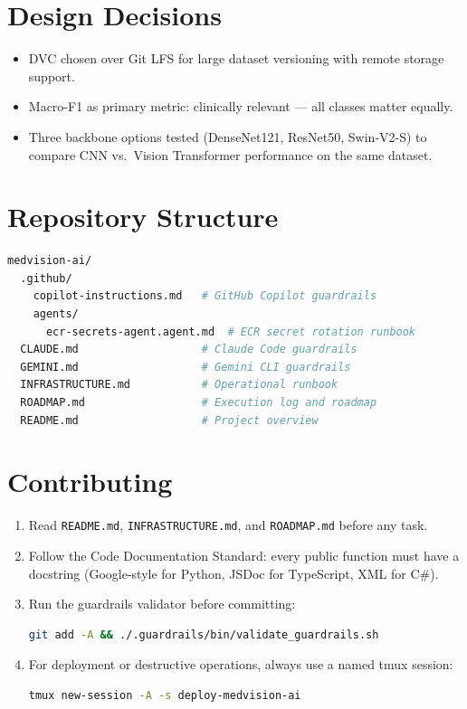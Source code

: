 \documentclass[11pt,a4paper]{article}
\begin{document}
\section{Design Decisions}

\begin{itemize}
  \item DVC chosen over Git LFS for large dataset versioning with remote storage support.
  \item Macro-F1 as primary metric: clinically relevant — all classes matter equally.
  \item Three backbone options tested (DenseNet121, ResNet50, Swin-V2-S) to compare
    CNN vs.\ Vision Transformer performance on the same dataset.
\end{itemize}


\section{Repository Structure}
\begin{lstlisting}[language=bash,caption={Top-level directory layout}]
medvision-ai/
  .github/
    copilot-instructions.md   # GitHub Copilot guardrails
    agents/
      ecr-secrets-agent.agent.md  # ECR secret rotation runbook
  CLAUDE.md                   # Claude Code guardrails
  GEMINI.md                   # Gemini CLI guardrails
  INFRASTRUCTURE.md           # Operational runbook
  ROADMAP.md                  # Execution log and roadmap
  README.md                   # Project overview
\end{lstlisting}

\section{Contributing}
\begin{enumerate}
  \item Read \texttt{README.md}, \texttt{INFRASTRUCTURE.md}, and \texttt{ROADMAP.md} before any task.
  \item Follow the Code Documentation Standard: every public function must have
    a docstring (Google-style for Python, JSDoc for TypeScript, XML for C\#).
  \item Run the guardrails validator before committing:
    \begin{lstlisting}[language=bash]
git add -A && ./.guardrails/bin/validate_guardrails.sh
    \end{lstlisting}
  \item For deployment or destructive operations, always use a named tmux session:
    \begin{lstlisting}[language=bash]
tmux new-session -A -s deploy-medvision-ai
    \end{lstlisting}
\end{enumerate}
\end{document}
